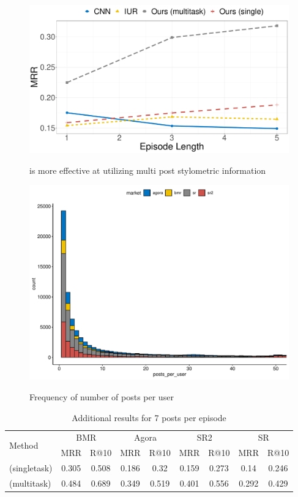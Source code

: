 \begin{figure}[!htbp]
    \centering
    \includegraphics[width=0.8\linewidth,alt={Line chart showing the improvements from \SYSMLmethodname{} across different episode lengths.}]{sysml/plots/length_comparison.pdf}
    \caption{\SYSMLmethodname{} is more effective at utilizing multi post stylometric information}
    \label{fig:len_comparison}
\end{figure}


\begin{figure}
    \centering
    \includegraphics[width=\linewidth,alt={Histogram of posts per user.}]{sysml/plots/posts_histogram.pdf}
    \caption{Frequency of number of posts per user}
    \label{fig:posts_freq}
\end{figure}

\begin{table}[!htbp]
    \small
    \centering
		\begin{tabular}{lcccccccc}
 		\toprule
			\multirow{2}{*}{Method}	&\multicolumn{2}{c}{BMR}	&	\multicolumn{2}{c}{Agora}	&	\multicolumn{2}{c}{SR2}	&	\multicolumn{2}{c}{SR}\\
					&MRR&	R@10&	MRR&	R@10&	MRR&	R@10&	MRR&	R@10\\
		\midrule
			\SYSMLmethodname{}  (singletask) &	0.305	&	0.508	&	0.186	&	0.32	&	0.159	&	0.273	&	0.14	&	0.246	\\
				\hline
			\SYSMLmethodname{}  (multitask) &	0.484	& 0.689	&	0.349	&	0.519	&	0.401	&	0.556	&	0.292	&	0.429	\\
					\bottomrule
    	\end{tabular}
    	\caption{Additional results for 7 posts per episode}
      \label{tab:additional_res_7}
\end{table}

